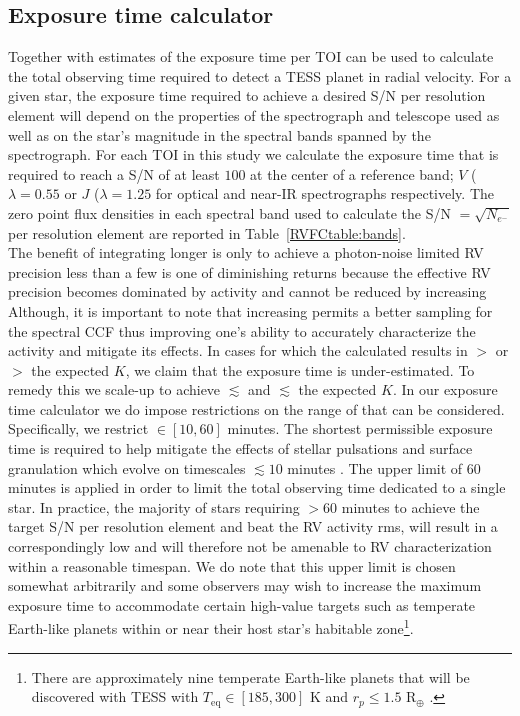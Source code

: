 \subsection{Exposure time calculator} \label{RVFCsect:etc}
Together with estimates of \nrv{,}
the exposure time \texp{} per TOI can be used to calculate the total observing
time required to detect a TESS planet in radial velocity. For a given star, the exposure time required to
achieve a desired S/N per resolution element will depend on the properties of the spectrograph and telescope
used as well as on the star's magnitude in the spectral bands spanned by the spectrograph.
For each TOI in this study we calculate the exposure time that is required to reach a S/N of at least $100$
at the center of a reference band; $V$ ($\lambda=0.55$ \micron{)} or $J$ ($\lambda=1.25$ \micron{)} for optical
and near-IR spectrographs respectively. The zero point flux densities in each spectral band used to
calculate the S/N $=\sqrt{N_{e^-}}$ per resolution element are reported in Table~\ref{RVFCtable:bands}. \\

The benefit of integrating longer is only to achieve a photon-noise
limited RV precision less than a few \sigact{,} is one of diminishing returns because the effective RV precision
becomes dominated by activity and cannot be reduced by increasing  Although, it is important to note that
increasing \texp{} permits a better sampling for the spectral CCF thus improving one's ability to accurately
characterize the activity and mitigate its effects. In cases for which
the calculated \texp{} results in \sigRV{} $>$ \sigact{} or
$>$ the expected $K$, we claim that the exposure time is under-estimated. To remedy this we
scale-up \texp{} to achieve \sigRV{} $\lesssim$ \sigact{} and $\lesssim$ the expected $K$.
In our exposure time calculator 
we do impose restrictions on the range of \texp{} that can be considered. Specifically, we restrict
\texp{} $\in [10,60]$ minutes. The shortest permissible exposure time is required to help mitigate
the effects of stellar pulsations and surface granulation which evolve on timescales $\lesssim 10$ minutes
\citep{lovis05, dumusque11a}.
The upper limit of 60 minutes is applied in order to limit the total observing time dedicated to a single star.
In practice, the majority of stars requiring $>60$ minutes to achieve the target S/N per resolution element and
beat the RV activity rms,
will result in a correspondingly low \sigK{} and will therefore not be amenable to RV 
characterization within a reasonable timespan.
We do note that this upper limit is chosen somewhat arbitrarily and some observers may wish to increase the
maximum exposure time 
to accommodate certain high-value targets such as temperate Earth-like planets within or
near their host star's habitable zone\footnote{There are approximately nine temperate Earth-like planets
  that will be discovered
  with TESS with $T_{\text{eq}} \in [185,300]$ K and $r_p \leq 1.5$ R$_{\oplus}$ .}.



